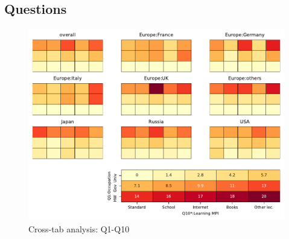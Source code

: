 
\subsection{Questions}


\begin{figure}
\begin{center}
\includegraphics[width=12cm]{../pdfs/Q1-Q10.pdf}
\caption{Cross-tab analysis: Q1-Q10}
\label{fig:Q1-Q10}
\end{center}
\end{figure}
